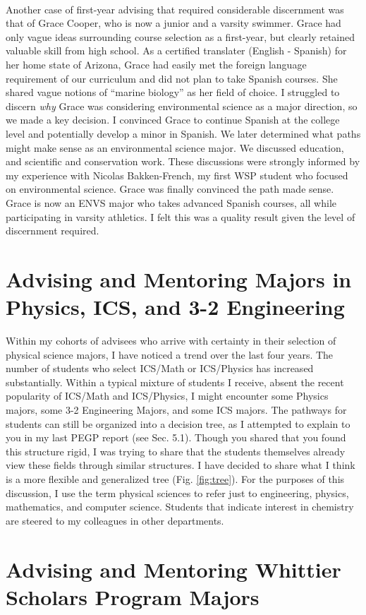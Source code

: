 \documentclass[../../main.tex]{subfiles}
\begin{document}
\\
\vspace{0.25cm}
Another case of first-year advising that required considerable discernment was that of Grace Cooper, who is now a junior and a varsity swimmer.  Grace had only vague ideas surrounding course selection as a first-year, but clearly retained valuable skill from high school.  As a certified translater (English - Spanish) for her home state of Arizona, Grace had easily met the foreign language requirement of our curriculum and did not plan to take Spanish courses.  She shared vague notions of ``marine biology'' as her field of choice.  I struggled to discern \textit{why} Grace was considering environmental science as a major direction, so we made a key decision.  I convinced Grace to continue Spanish at the college level and potentially develop a minor in Spanish.  We later determined what paths might make sense as an environmental science major.  We discussed education, and scientific and conservation work.  These discussions were strongly informed by my experience with Nicolas Bakken-French, my first WSP student who focused on environmental science.  Grace was finally convinced the path made sense.  Grace is now an ENVS major who takes advanced Spanish courses, all while participating in varsity athletics.  I felt this was a quality result given the level of discernment required.

\section{Advising and Mentoring Majors in Physics, ICS, and 3-2 Engineering}

Within my cohorts of advisees who arrive with certainty in their selection of physical science majors, I have noticed a trend over the last four years.  The number of students who select ICS/Math or ICS/Physics has increased substantially.  Within a typical mixture of students I receive, absent the recent popularity of ICS/Math and ICS/Physics, I might encounter some Physics majors, some 3-2 Engineering Majors, and some ICS majors.  The pathways for students can still be organized into a decision tree, as I attempted to explain to you in my last PEGP report (see Sec. 5.1).  Though you shared that you found this structure rigid, I was trying to share that the students themselves already view these fields through similar structures.  I have decided to share what I think is a more flexible and generalized tree (Fig. \ref{fig:tree}).  For the purposes of this discussion, I use the term physical sciences to refer just to engineering, physics, mathematics, and computer science.  Students that indicate interest in chemistry are steered to my colleagues in other departments. 

\section{Advising and Mentoring Whittier Scholars Program Majors}
\end{document}
